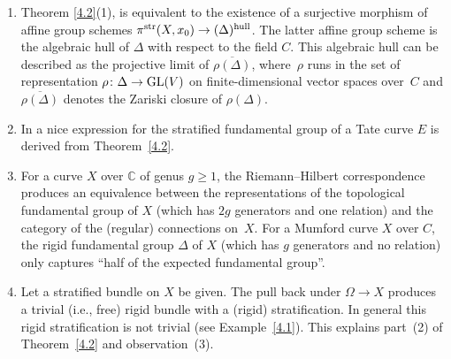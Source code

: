 \documentclass[pdftex]{sigma}
\numberwithin{equation}{section}
\begin{document}
\begin{Observations}\label{4.3} \quad
\begin{enumerate}\itemsep=0pt
\item[(1)] Theorem \ref{4.2}(1), is equivalent to the existence of a surjective morphism of affine group schemes $\pi^{\rm str}(X,x_0)\rightarrow (\Delta)^{\rm hull}$. The latter affine group scheme is the algebraic hull of $\Delta$ with respect to the field $C$. This algebraic hull can be described as the projective limit of $\overline{\rho(\Delta)}$, where~$\rho$ runs in the set of representation $\rho\colon \Delta \rightarrow {\rm GL}(V)$ on finite-dimensional vector spaces over~$C$ and $\overline{\rho(\Delta)}$ denotes the Zariski closure of $\rho(\Delta)$.
\item[(2)]In \cite{Sa} a nice expression for the stratified fundamental group of a Tate curve $E$ is derived from Theorem~\ref{4.2}.
\item[(3)]For a curve $X$ over $\mathbb{C}$ of genus $g\geq 1$, the Riemann--Hilbert correspondence produces an equivalence between the representations of the topological fundamental group of $X$ (which has $2g$ generators and one relation) and the category of the (regular) connections on~$X$. For a Mumford curve $X$ over $C$, the rigid fundamental group $\Delta$ of $X$ (which has $g$ generators and no relation) only captures ``half of the expected fundamental group''.
\item[(4)]Let a stratified bundle on $X$ be given. The pull back under $\Omega \rightarrow X$ produces a trivial (i.e., free) rigid bundle with a (rigid) stratification. In general this rigid stratification is not trivial (see Example~\ref{4.1}). This explains part~(2) of Theorem~\ref{4.2} and observation~(3).
\end{enumerate}
\end{Observations}
\end{document}
